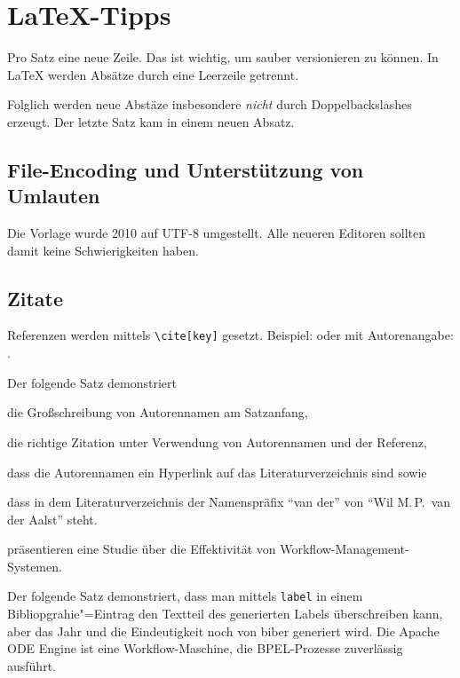 \chapter{LaTeX-Tipps}
\label{chap:latextipps}

Pro Satz eine neue Zeile.
Das ist wichtig, um sauber versionieren zu können.
In LaTeX werden Absätze durch eine Leerzeile getrennt.

Folglich werden neue Abstäze insbesondere \emph{nicht} durch Doppelbackslashes erzeugt.
Der letzte Satz kam in einem neuen Absatz.

\section{File-Encoding und Unterstützung von Umlauten}
\label{sec:firstsectioninlatexhints}
Die Vorlage wurde 2010 auf UTF-8 umgestellt.
Alle neueren Editoren sollten damit keine Schwierigkeiten haben.

\section{Zitate}
Referenzen werden mittels \texttt{\textbackslash cite[key]} gesetzt.
Beispiel: \cite{WSPA} oder mit Autorenangabe: \citet{WSPA}.

Der folgende Satz demonstriert \begin{inparaenum}[1.]
\item die Großschreibung von Autorennamen am Satzanfang,
\item die richtige Zitation unter Verwendung von Autorennamen und der Referenz,
\item dass die Autorennamen ein Hyperlink auf das Literaturverzeichnis sind sowie
\item dass in dem Literaturverzeichnis der Namenspräfix \enquote{van der} von \enquote{Wil M.\,P.\ van der Aalst} steht.
\end{inparaenum}
 präsentieren eine Studie über die Effektivität von Workflow-Management-Systemen.

Der folgende Satz demonstriert, dass man mittels \texttt{label} in einem Bibliopgrahie"=Eintrag den Textteil des generierten Labels überschreiben kann, aber das Jahr und die Eindeutigkeit noch von biber generiert wird.
Die Apache ODE Engine \cite{ApacheODE} ist eine Workflow-Maschine, die BPEL-Prozesse zuverlässig ausführt.

